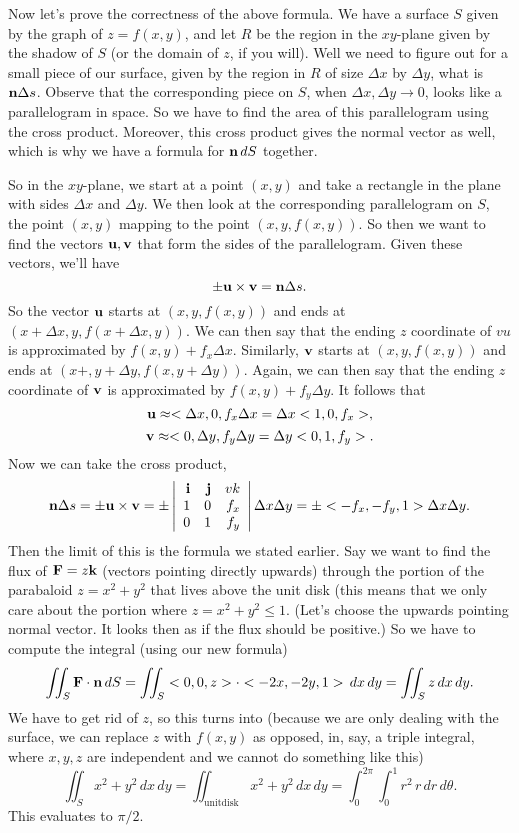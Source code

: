 Now let's prove the correctness of the above formula. We have a surface $S$ given by the graph of $z=f(x,y)$, and let $R$ be the region in the $xy$-plane given by the shadow of $S$ (or the domain of $z$, if you will). Well we need to figure out for a small piece of our surface, given by the region in $R$ of size $\Delta x$ by $\Delta y$, what is $\boldsymbol{\mathbf{n}} \Delta s$. Observe that the corresponding piece on $S$, when $\Delta x,\Delta y\to 0$, looks like a parallelogram in space. So we have to find the area of this parallelogram using the cross product. Moreover, this cross product gives the normal vector as well, which is why we have a formula for $\boldsymbol{\mathbf{n}}\,dS$ together. 

So in the $xy$-plane, we start at a point $(x,y)$ and take a rectangle in the plane with sides $\Delta x$ and $\Delta y$. We then look at the corresponding parallelogram on $S$, the point $(x,y)$ mapping to the point $(x,y,f(x,y))$. So then we want to find the vectors $\boldsymbol{\mathbf{u}},\boldsymbol{\mathbf{v}}$ that form the sides of the parallelogram. Given these vectors, we'll have
\[ \pm \boldsymbol{\mathbf{u}} \times \boldsymbol{\mathbf{v}} = \boldsymbol{\mathbf{n}} \Delta s. \]
So the vector $\boldsymbol{\mathbf{u}}$ starts at $(x,y,f(x,y))$ and ends at $(x+\Delta x,y,f(x+\Delta x,y))$. We can then say that the ending $z$ coordinate of $vu$ is approximated by $f(x,y)+f_x\Delta x$. Similarly, $\boldsymbol{\mathbf{v}}$ starts at $(x,y,f(x,y))$ and ends at $(x+,y+\Delta y,f(x,y + \Delta y))$. Again, we can then say that the ending $z$ coordinate of $\boldsymbol{\mathbf{v}}$ is approximated by $f(x,y)+f_y\Delta y$. It follows that 
\[ \boldsymbol{\mathbf{u}} \approx <\Delta x, 0, f_x\Delta x = \Delta x <1,0,f_x>, \]
\[ \boldsymbol{\mathbf{v}} \approx <0,\Delta y,f_y \Delta y = \Delta y <0,1,f_y>. \]
Now we can take the  cross product,
\[ \boldsymbol{\mathbf{n}} \Delta s = \pm \boldsymbol{\mathbf{u}} \times \boldsymbol{\mathbf{v}} = \pm \left| \begin{array}{rrrrrrrrrrrrrrrrrrrrrrrrr} \boldsymbol{\mathbf{i}} & \boldsymbol{\mathbf{j}} & vk \\ 1 & 0 & f_x \\ 0 & 1 & f_y\\ \end{array} \right|\Delta x \Delta y = \pm<-f_x,-f_y,1>\Delta x \Delta y. \] 
Then the limit of this is the formula we stated earlier. 
\bex
Say we want to find the flux of $\boldsymbol{\mathbf{F}} = z\boldsymbol{\mathbf{k}}$ (vectors pointing directly upwards) through the portion of the parabaloid $z = x^2 + y^2$ that lives above the unit disk (this means that we only care about the portion where $z = x^2+y^2 \le 1$. (Let's choose the upwards pointing normal vector. It looks then as if the flux should be positive.) So we have to compute the integral (using our new formula)
\[ \iint_S \boldsymbol{\mathbf{F}} \cdot \boldsymbol{\mathbf{n}}\,dS = \iint_S <0,0,z> \cdot <-2x,-2y,1> \,dx\,dy = \iint_S z\,dx\,dy. \]
We have to get rid of $z$, so this turns into (because we are only dealing with the surface, we can replace $z$ with $f(x,y)$ as opposed, in, say, a triple integral, where $x,y,z$ are independent and we cannot do something like this)
\[ \iint_S x^2+y^2\,dx\,dy = \iint_{\mathrm{unit disk}} x^2+y^2\,dx\,dy = \int_0^{2\pi} \int_0^1 r^2 \,r\,dr\,d\theta. \]
This evaluates to $\pi/2$.
\eex 

